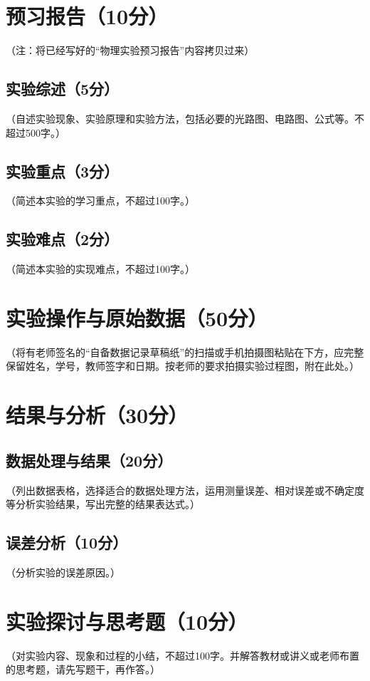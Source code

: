 \documentclass{Phyport}
\begin{document}
\setcounter{page}{0}
\makecover

\section{预习报告（10分）}
（注：将已经写好的“物理实验预习报告”内容拷贝过来）

\subsection{实验综述（5分）}
（自述实验现象、实验原理和实验方法，包括必要的光路图、电路图、公式等。不超过500字。）

\subsection{实验重点（3分）}
（简述本实验的学习重点，不超过100字。）

\subsection{实验难点（2分）}
（简述本实验的实现难点，不超过100字。）

\section{实验操作与原始数据（50分）}
（将有老师签名的“自备数据记录草稿纸”的扫描或手机拍摄图粘贴在下方，应完整保留姓名，学号，教师签字和日期。按老师的要求拍摄实验过程图，附在此处。）

\section{结果与分析（30分）}
\subsection{数据处理与结果（20分）}
（列出数据表格，选择适合的数据处理方法，运用测量误差、相对误差或不确定度等分析实验结果，写出完整的结果表达式。）

\subsection{误差分析（10分）}
（分析实验的误差原因。）

\section{实验探讨与思考题（10分）}
（对实验内容、现象和过程的小结，不超过100字。并解答教材或讲义或老师布置的思考题，请先写题干，再作答。）


\end{document}
